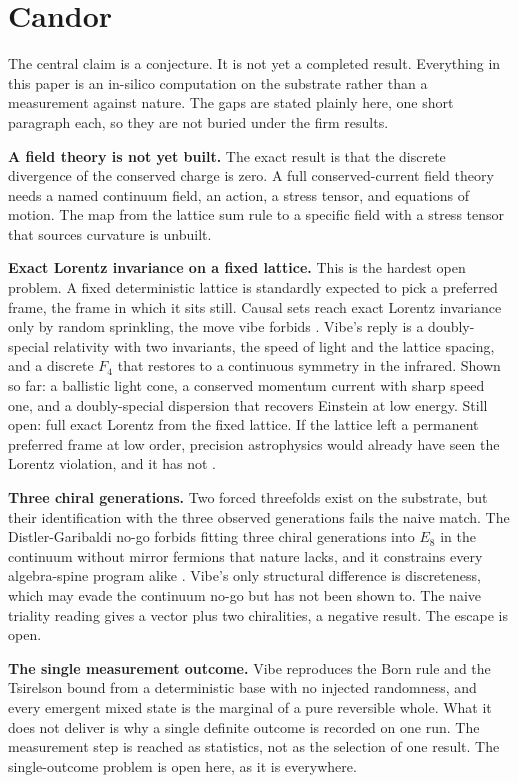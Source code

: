 \section{Candor}

The central claim is a conjecture. It is not yet a completed result. Everything in this paper is an in-silico computation on the
substrate rather than a measurement against nature. The gaps are stated plainly here, one short paragraph each, so they are
not buried under the firm results.

\textbf{A field theory is not yet built.} The exact result is that the discrete divergence of the conserved charge is zero.
A full conserved-current field theory needs a named continuum field, an action, a stress tensor, and equations of motion.
The map from the lattice sum rule to a specific field with a stress tensor that sources curvature is unbuilt.

\textbf{Exact Lorentz invariance on a fixed lattice.} This is the hardest open problem. A fixed deterministic lattice is
standardly expected to pick a preferred frame, the frame in which it sits still. Causal sets reach exact Lorentz invariance
only by random sprinkling, the move vibe forbids \cite{bombelli1987, dowker2004}. Vibe's reply is a doubly-special
relativity with two invariants, the speed of light and the lattice spacing, and a discrete $F_4$ that restores to a
continuous symmetry in the infrared. Shown so far: a ballistic light cone, a conserved momentum current with sharp speed
one, and a doubly-special dispersion that recovers Einstein at low energy. Still open: full exact Lorentz from the fixed lattice.
If the lattice left a permanent preferred frame at low order, precision astrophysics would already have seen the Lorentz
violation, and it has not \cite{thooft2016}.

\textbf{Three chiral generations.} Two forced threefolds exist on the substrate, but their identification with the three
observed generations fails the naive match. The Distler-Garibaldi no-go forbids fitting three chiral generations into $E_8$
in the continuum without mirror fermions that nature lacks, and it constrains every algebra-spine program alike \cite{distler2010,
boyle2020}. Vibe's only structural difference is discreteness, which may evade the continuum no-go but has not been shown
to. The naive triality reading gives a vector plus two chiralities, a negative result. The escape is open.

\textbf{The single measurement outcome.} Vibe reproduces the Born rule and the Tsirelson bound from a deterministic base
with no injected randomness, and every emergent mixed state is the marginal of a pure reversible whole. What it does not
deliver is why a single definite outcome is recorded on one run. The measurement step is reached as statistics, not as the
selection of one result. The single-outcome problem is open here, as it is everywhere.

